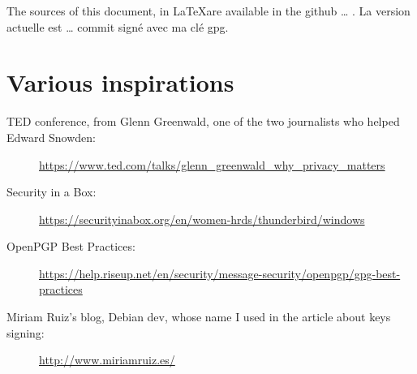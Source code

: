 \documentclass[10pt,a4paper,openany]{book}
\begin{document}
	The sources of this document, in \LaTeX are available in the github  … . La version actuelle est … commit signé avec ma clé gpg.
	
	\tableofcontents
	
	
	
	
		
	
	
	
	
	\chapter{Various inspirations}
	
	\begin{description}
		\item[TED conference, from Glenn Greenwald, one of the two journalists who helped Edward Snowden:] \url{https://www.ted.com/talks/glenn_greenwald_why_privacy_matters}
			
		\item[Security in a Box:]\url{https://securityinabox.org/en/women-hrds/thunderbird/windows}
		
		\item[OpenPGP Best Practices:]\url{https://help.riseup.net/en/security/message-security/openpgp/gpg-best-practices}
		
		\item[Miriam Ruiz's blog, Debian dev, whose name I used in the article about keys signing:]\url{http://www.miriamruiz.es/}\\
		
	\end{description}
	
\end{document}
